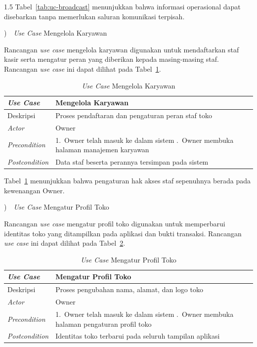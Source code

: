 \documentclass[12pt, a4paper, onecolumn, oneside]{report}
\begin{document}
\begin{spacing}{1.5}
Tabel~\ref{tab:uc-broadcast} menunjukkan bahwa informasi operasional dapat disebarkan tanpa memerlukan saluran komunikasi terpisah.

)~~\textit{Use Case} Mengelola Karyawan

Rancangan \textit{use case} mengelola karyawan digunakan untuk mendaftarkan staf kasir serta mengatur peran yang diberikan kepada masing-masing staf. Rancangan \textit{use case} ini dapat dilihat pada Tabel~\ref{tab:uc-karyawan}.

\begin{table}[H]
\centering
\caption{\textit{Use Case} Mengelola Karyawan}
\label{tab:uc-karyawan}
\begin{tabularx}{\textwidth}{|p{3.2cm}|X|}
\hline
\textbf{\textit{Use Case}} & \textbf{Mengelola Karyawan} \\ \hline
Deskripsi & Proses pendaftaran dan pengaturan peran staf toko \\ \hline
\textit{Actor} & Owner \\ \hline
\textit{Precondition} & 1.~Owner telah masuk ke dalam sistem \newline 2.~Owner membuka halaman manajemen karyawan \\ \hline
\textit{Postcondition} & Data staf beserta perannya tersimpan pada sistem \\ \hline
\end{tabularx}
\end{table}

Tabel~\ref{tab:uc-karyawan} menunjukkan bahwa pengaturan hak akses staf sepenuhnya berada pada kewenangan Owner.

)~~\textit{Use Case} Mengatur Profil Toko

Rancangan \textit{use case} mengatur profil toko digunakan untuk memperbarui identitas toko yang ditampilkan pada aplikasi dan bukti transaksi. Rancangan \textit{use case} ini dapat dilihat pada Tabel~\ref{tab:uc-profil}.

\begin{table}[H]
\centering
\caption{\textit{Use Case} Mengatur Profil Toko}
\label{tab:uc-profil}
\begin{tabularx}{\textwidth}{|p{3.2cm}|X|}
\hline
\textbf{\textit{Use Case}} & \textbf{Mengatur Profil Toko} \\ \hline
Deskripsi & Proses pengubahan nama, alamat, dan logo toko \\ \hline
\textit{Actor} & Owner \\ \hline
\textit{Precondition} & 1.~Owner telah masuk ke dalam sistem \newline 2.~Owner membuka halaman pengaturan profil toko \\ \hline
\textit{Postcondition} & Identitas toko terbarui pada seluruh tampilan aplikasi \\ \hline
\end{tabularx}
\end{table}


\end{spacing}
\end{document}
